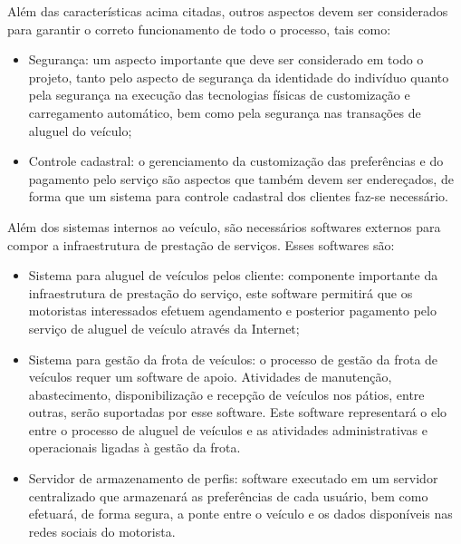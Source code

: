 \documentclass[12pt,journal,compsoc]{IEEEtran}
\begin{document}
Além das características acima citadas, outros aspectos devem ser considerados para garantir o correto funcionamento de todo o processo, tais como:

\begin{itemize}

\item Segurança: um aspecto importante que deve ser considerado em todo o projeto, tanto pelo aspecto de segurança da identidade do indivíduo quanto pela segurança na execução das tecnologias físicas de customização e carregamento automático, bem como pela segurança nas transações de aluguel do veículo;

\item Controle cadastral: o gerenciamento da customização das preferências e do pagamento pelo serviço são aspectos que também devem ser endereçados, de forma que um sistema para controle cadastral dos clientes faz-se necessário.

\end{itemize}

Além dos sistemas internos ao veículo, são necessários softwares externos para compor a infraestrutura de prestação de serviços. Esses softwares são:

\begin{itemize}

\item Sistema para aluguel de veículos pelos cliente: componente importante da infraestrutura de prestação do serviço, este software permitirá que os motoristas interessados efetuem agendamento e posterior pagamento pelo serviço de aluguel de veículo através da Internet;

\item Sistema para gestão da frota de veículos: o processo de gestão da frota de veículos requer um software de apoio. Atividades de manutenção, abastecimento, disponibilização e recepção de veículos nos pátios, entre outras, serão suportadas por esse software. Este software representará o elo entre o processo de aluguel de veículos e as atividades administrativas e operacionais ligadas à gestão da frota.

\item Servidor de armazenamento de perfis: software executado em um servidor centralizado que armazenará as preferências de cada usuário, bem como efetuará, de forma segura, a ponte entre o veículo e os dados disponíveis nas redes sociais do motorista.

\end{itemize}
\end{document}
